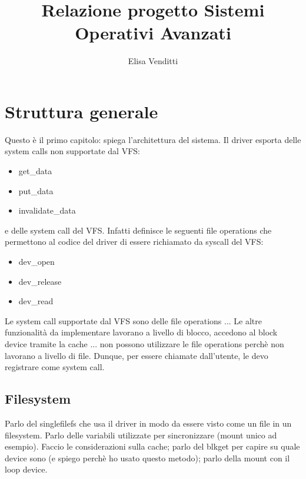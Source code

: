 \documentclass[a4paper,12pt,oneside]{book}
\title{Relazione progetto Sistemi Operativi Avanzati}
\author{Elisa Venditti}
\date{}
\begin{document}
	\begin{titlepage}	
		\maketitle
	\end{titlepage}

	\frontmatter
	\tableofcontents
	\mainmatter

	\chapter{Struttura generale}
	Questo è il primo capitolo: spiega l'architettura del sistema. Il driver esporta delle system calls non supportate dal VFS:
	\begin{itemize}
		\item get\_data
		\item put\_data
		\item invalidate\_data
	\end{itemize}
	e delle system call del VFS. Infatti definisce le seguenti file operations che permettono al codice del driver di essere richiamato da syscall del VFS:
	\begin{itemize}
		\item dev\_open
		\item dev\_release
		\item dev\_read
	\end{itemize}
	
	Le system call supportate dal VFS sono delle file operations ... Le altre funzionalità da implementare lavorano a livello di blocco, accedono al block device tramite la cache ... non possono utilizzare le file operations perchè non lavorano a livello di file. Dunque, per essere chiamate dall'utente, le devo registrare come system call.

	\section{Filesystem}
	Parlo del singlefilefs che usa il driver in modo da essere visto come un file in un filesystem. Parlo delle variabili utilizzate per sincronizzare (mount unico ad esempio). Faccio le considerazioni sulla cache; parlo del blkget per capire su quale device sono (e spiego perchè ho usato questo metodo); parlo della mount con il  loop device. 
	
\end{document}
